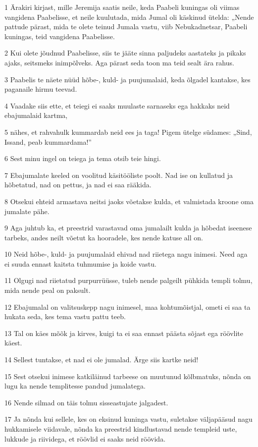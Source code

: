 \par 1 Ärakiri kirjast, mille Jeremija saatis neile, keda Paabeli  kuningas oli viimas vangidena Paabelisse, et neile kuulutada, mida  Jumal oli käskinud ütelda: „Nende pattude pärast, mida te olete teinud Jumala vastu, viib  Nebukadnetsar, Paabeli kuningas, teid vangidena Paabelisse.
\par 2 Kui olete jõudnud Paabelisse, siis te jääte sinna paljudeks  aastateks ja pikaks ajaks, seitsmeks inimpõlveks. Aga pärast seda  toon ma teid sealt ära rahus.
\par 3 Paabelis te näete nüüd hõbe-, kuld- ja puujumalaid, keda õlgadel  kantakse, kes paganaile hirmu teevad.
\par 4 Vaadake siis ette, et teiegi ei saaks muulaste sarnaseks ega  hakkaks neid ebajumalaid kartma,
\par 5 nähes, et rahvahulk kummardab neid ees ja taga! Pigem ütelge  südames: „Sind, Issand, peab kummardama!”
\par 6 Sest minu ingel on teiega ja tema otsib teie hingi.
\par 7 Ebajumalate keeled on voolitud käsitööliste poolt. Nad ise  on kullatud ja hõbetatud, nad on pettus, ja nad ei saa rääkida.
\par 8 Otsekui ehteid armastava neitsi jaoks võetakse kulda, et  valmistada kroone oma jumalate pähe.
\par 9 Aga juhtub ka, et preestrid varastavad oma jumalailt kulda ja  hõbedat iseenese tarbeks, andes neilt võetut ka hooradele, kes nende  katuse all on.
\par 10 Neid hõbe-, kuld- ja puujumalaid ehivad nad riietega nagu  inimesi. Need aga ei suuda ennast kaitsta tuhmumise ja koide vastu.
\par 11 Olgugi nad riietatud purpurrüüsse, tuleb nende palgeilt pühkida  templi tolmu, mida nende peal on paksult.
\par 12 Ebajumalal on valitsuskepp nagu inimesel, maa kohtumõistjal,  ometi ei saa ta hukata seda, kes tema vastu pattu teeb.
\par 13 Tal on käes mõõk ja kirves, kuigi ta ei saa ennast päästa  sõjast ega röövlite käest.
\par 14 Sellest tuntakse, et nad ei ole jumalad. Ärge siis kartke neid!
\par 15 Sest otsekui inimese katkiläinud tarbeese on muutunud kõlbmatuks,  nõnda on lugu ka nende templitesse pandud jumalatega.
\par 16 Nende silmad on täis tolmu sisseastujate jalgadest.
\par 17 Ja nõnda kui sellele, kes on eksinud kuninga vastu, suletakse väljapääsud  nagu hukkamisele viidavale, nõnda ka preestrid kindlustavad  nende templeid uste, lukkude ja riividega, et röövlid ei saaks neid  röövida.

